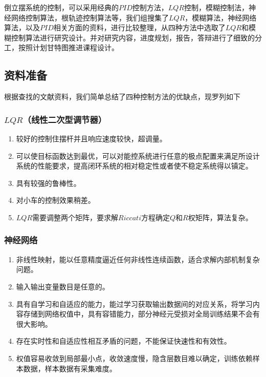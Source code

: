 \documentclass{MathorCupmodeling}
\begin{document}
倒立摆系统的控制，可以采用经典的$PID$控制方法，$LQR$控制，模糊控制法，神经网络控制算法，根轨迹控制算法等，我们组搜集了$LQR$，模糊算法，神经网络算法，以及$PID$相关方面的资料，进行比较整理，从四种方法中选取了$LQR$和模糊控制算法进行研究设计。并对研究内容，进度规划，报告，答辩进行了细致的分工，按照计划甘特图推进课程设计。

\subsection{资料准备}


根据查找的文献资料，我们简单总结了四种控制方法的优缺点，现罗列如下

\subsubsection{$LQR$（线性二次型调节器）}
\begin{enumerate}
\item 较好的控制住摆杆并且响应速度较快，超调量。
\item 可以使目标函数达到最优，可以对能控系统进行任意的极点配置来满足所设计系统的性能要求，提高闭环系统的相对稳定性或者使不稳定系统得以镇定。
\item 具有较强的鲁棒性。
\item 对小车的控制效果稍差。
\item $LQR$需要调整两个矩阵，要求解$Riccati$方程确定$Q$和$R$权矩阵，算法复杂。
\end{enumerate}

\subsubsection{神经网络}
\begin{enumerate}
\item 非线性映射，能以任意精度逼近任何非线性连续函数，适合求解内部机制复杂问题。
\item 输入输出变量数目是任意的。
\item 具有自学习和自适应的能力，能过学习获取输出数据间的对应关系，将学习内容存储到网络权值中，具有容错能力，部分神经元受损对全局训练结果不会有很大影响。
\item 存在实时性和自适应性相互矛盾的问题，不能保证快速性和有效性。
\item 权值容易收敛到局部最小点，收敛速度慢，隐含层数目难以确定，训练依赖样本数据，样本数据有采集难度。
\end{enumerate}
\end{document}
